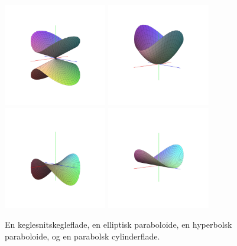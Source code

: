




\begin{figure}[ht]
\centerline{  \includegraphics[height=45mm]{FIGS/plotKKegle.pdf} \includegraphics[height=45mm]{FIGS/plotEllipPar.pdf} \includegraphics[height=45mm]{FIGS/plotHypPar.pdf} \includegraphics[height=45mm]{FIGS/plotParCyl.pdf} }
\begin{center}
\caption{En keglesnitskegleflade, en elliptisk paraboloide, en hyperbolsk paraboloide, og en parabolsk cylinderflade.} \label{figGrafFlad}
\end{center}
\end{figure}







